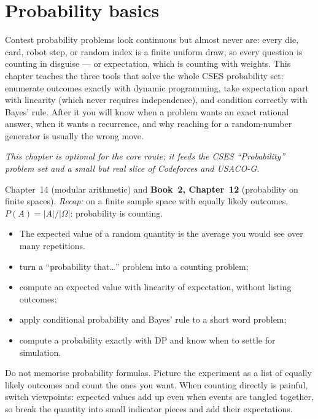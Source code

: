 \chapter{Probability basics}\label{ch:prob}

Contest probability problems look continuous but almost never
are: every die, card, robot step, or random index is a finite
uniform draw, so every question is counting in disguise --- or
expectation, which is counting with weights. This chapter
teaches the three tools that solve the whole CSES probability
set: enumerate outcomes exactly with dynamic programming, take
expectation apart with linearity (which never requires
independence), and condition correctly with Bayes' rule. After
it you will know when a problem wants an exact rational answer,
when it wants a recurrence, and why reaching for a random-number
generator is usually the wrong move.

\emph{This chapter is optional for the core route; it feeds the
CSES ``Probability'' problem set and a small but real slice of
Codeforces and USACO-G.}

\begin{rulebox}
Chapter~14 (modular arithmetic) and \textbf{Book~2, Chapter~12} (probability on finite spaces). \emph{Recap:} on a finite sample space with equally likely outcomes, $P(A)=|A|/|\Omega|$: probability is counting.
\begin{itemize}
\item The expected value of a random quantity is the average you would see over many repetitions.
\end{itemize}
\end{rulebox}
\begin{wins}
\begin{itemize}
\item turn a ``probability that\dots'' problem into a counting problem;
\item compute an expected value with linearity of expectation, without listing outcomes;
\item apply conditional probability and Bayes' rule to a short word problem;
\item compute a probability exactly with DP and know when to settle for simulation.
\end{itemize}
\end{wins}
\begin{principle}
Do not memorise probability formulas. Picture the experiment as a list of equally likely outcomes and count the ones you want. When counting directly is painful, switch viewpoints: expected values add up even when events are tangled together, so break the quantity into small indicator pieces and add their expectations.
\end{principle}


